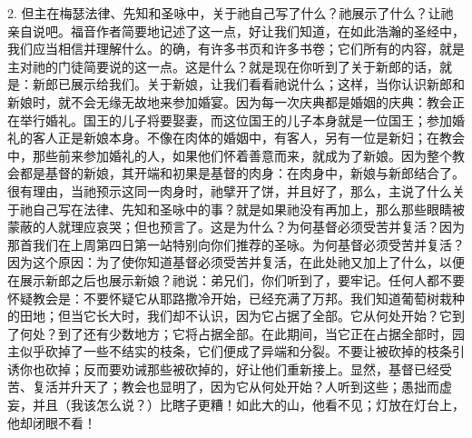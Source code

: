 2. 但主在梅瑟法律、先知和圣咏中，关于祂自己写了什么？祂展示了什么？让祂亲自说吧。福音作者简要地记述了这一点，好让我们知道，在如此浩瀚的圣经中，我们应当相信并理解什么。的确，有许多书页和许多书卷；它们所有的内容，就是主对祂的门徒简要说的这一点。这是什么？就是现在你听到了关于新郎的话，就是：新郎已展示给我们。关于新娘，让我们看看祂说什么；这样，当你认识新郎和新娘时，就不会无缘无故地来参加婚宴。因为每一次庆典都是婚姻的庆典：教会正在举行婚礼。国王的儿子将要娶妻，而这位国王的儿子本身就是一位国王；参加婚礼的客人正是新娘本身。不像在肉体的婚姻中，有客人，另有一位是新妇；在教会中，那些前来参加婚礼的人，如果他们怀着善意而来，就成为了新娘。因为整个教会都是基督的新娘，其开端和初果是基督的肉身：在肉身中，新娘与新郎结合了。很有理由，当祂预示这同一肉身时，祂擘开了饼，并且好了，那么，主说了什么关于祂自己写在法律、先知和圣咏中的事？就是如果祂没有再加上，那么那些眼睛被蒙蔽的人就理应哀哭；但也预言了。这是为什么？为何基督必须受苦并复活？因为那首我们在上周第四日第一站特别向你们推荐的圣咏。为何基督必须受苦并复活？因为这个原因：为了使你知道基督必须受苦并复活，在此处祂又加上了什么，以便在展示新郎之后也展示新娘？祂说：弟兄们，你们听到了，要牢记。任何人都不要怀疑教会是：不要怀疑它从耶路撒冷开始，已经充满了万邦。我们知道葡萄树栽种的田地；但当它长大时，我们却不认识，因为它占据了全部。它从何处开始？它到了何处？到了还有少数地方；它将占据全部。在此期间，当它正在占据全部时，园主似乎砍掉了一些不结实的枝条，它们便成了异端和分裂。不要让被砍掉的枝条引诱你也砍掉；反而要劝诫那些被砍掉的，好让他们重新接上。显然，基督已经受苦、复活并升天了；教会也显明了，因为它从何处开始？人听到这些；愚拙而虚妄，并且（我该怎么说？）比瞎子更糟！如此大的山，他看不见；灯放在灯台上，他却闭眼不看！\par

